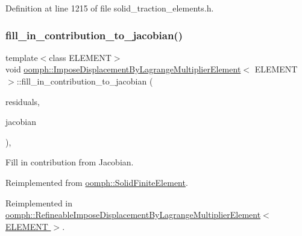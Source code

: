Definition at line 1215 of file solid\+\_\+traction\+\_\+elements.\+h.

\mbox{\label{classoomph_1_1ImposeDisplacementByLagrangeMultiplierElement_a8f196eaf084264031cf36fb541978123}} 
\subsubsection{\texorpdfstring{fill\+\_\+in\+\_\+contribution\+\_\+to\+\_\+jacobian()}{fill\_in\_contribution\_to\_jacobian()}}
{\footnotesize\ttfamily template$<$class E\+L\+E\+M\+E\+NT$>$ \\
void \hyperlink{classoomph_1_1ImposeDisplacementByLagrangeMultiplierElement}{oomph\+::\+Impose\+Displacement\+By\+Lagrange\+Multiplier\+Element}$<$ E\+L\+E\+M\+E\+NT $>$\+::fill\+\_\+in\+\_\+contribution\+\_\+to\+\_\+jacobian (\begin{DoxyParamCaption}\item[{\hyperlink{classoomph_1_1Vector}{Vector}$<$ double $>$ \&}]{residuals,  }\item[{\hyperlink{classoomph_1_1DenseMatrix}{Dense\+Matrix}$<$ double $>$ \&}]{jacobian }\end{DoxyParamCaption})\hspace{0.3cm}{\ttfamily [inline]}, {\ttfamily [virtual]}}



Fill in contribution from Jacobian. 



Reimplemented from \hyperlink{classoomph_1_1SolidFiniteElement_a3167a2005e33815948bef357214e15ee}{oomph\+::\+Solid\+Finite\+Element}.



Reimplemented in \hyperlink{classoomph_1_1RefineableImposeDisplacementByLagrangeMultiplierElement_af0d1b2633de720222d85e2083296a209}{oomph\+::\+Refineable\+Impose\+Displacement\+By\+Lagrange\+Multiplier\+Element$<$ E\+L\+E\+M\+E\+N\+T $>$}.



